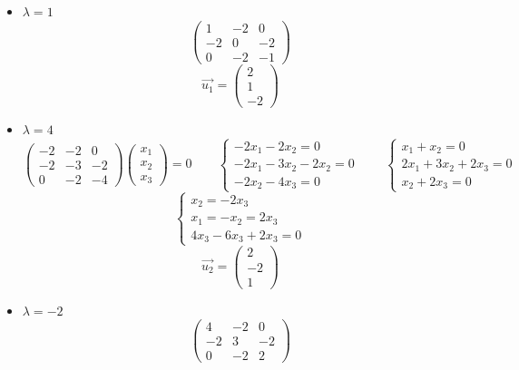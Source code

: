 \begin{itemize}
	\item $ \lambda = 1 $
    $$
    \begin{pmatrix}
    	1 & -2 & 0 \\
        -2 & 0 & -2 \\
        0 & -2 & -1
    \end{pmatrix} $$
    $$ \vec{u_1} =
    \begin{pmatrix}
    	2 \\
        1 \\
        -2
    \end{pmatrix} $$
    \item $ \lambda = 4 $
    $$
    \begin{pmatrix}
    	-2 & -2 & 0 \\
        -2 & -3 & -2 \\
        0 & -2 & -4
    \end{pmatrix}
    \begin{pmatrix}
    	x_1 \\
        x_2 \\
        x_3
    \end{pmatrix} = 0 \qquad
    \begin{cases}
    	-2x_1 - 2x_2 = 0 \\
        -2x_1 - 3x_2 - 2x_2 = 0 \\
        -2x_2 - 4x_3 = 0
    \end{cases} \qquad
    \begin{cases}
    	x_1 + x_2 = 0 \\
        2x_1 + 3x_2 + 2x_3 = 0 \\
        x_2 + 2x_3 = 0
    \end{cases} $$
    $$
    \begin{cases}
    	x_2 = -2x_3 \\
        x_1 = -x_2 = 2x_3 \\
        4x_3 - 6x_3 + 2x_3 = 0
    \end{cases} $$
    $$ \vec{u_2} =
    \begin{pmatrix}
    	2 \\
        -2 \\
        1
    \end{pmatrix} $$
    \item $ \lambda = -2 $
    $$
    \begin{pmatrix}
    	4 & -2 & 0 \\
        -2 & 3 & -2 \\
        0 & -2 & 2

\end{pmatrix}$$
\end{itemize}
